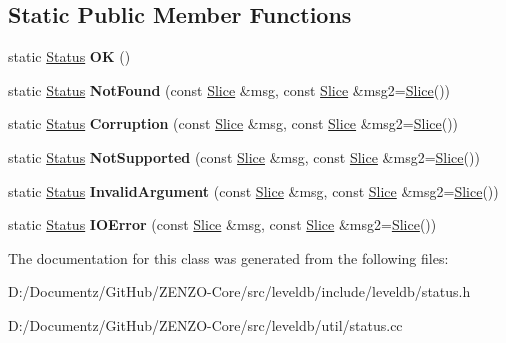 \subsection*{Static Public Member Functions}
\begin{DoxyCompactItemize}
\item 
\mbox{\label{classleveldb_1_1_status_a8e3720d233281c874a53c17e081f51b3}} 
static \mbox{\hyperlink{classleveldb_1_1_status}{Status}} {\bfseries OK} ()
\item 
\mbox{\label{classleveldb_1_1_status_a9e5beb5b2e758f041e0c012426e7b1b8}} 
static \mbox{\hyperlink{classleveldb_1_1_status}{Status}} {\bfseries Not\+Found} (const \mbox{\hyperlink{classleveldb_1_1_slice}{Slice}} \&msg, const \mbox{\hyperlink{classleveldb_1_1_slice}{Slice}} \&msg2=\mbox{\hyperlink{classleveldb_1_1_slice}{Slice}}())
\item 
\mbox{\label{classleveldb_1_1_status_a755b1ee5b0029cf9ea1128f1cdff5855}} 
static \mbox{\hyperlink{classleveldb_1_1_status}{Status}} {\bfseries Corruption} (const \mbox{\hyperlink{classleveldb_1_1_slice}{Slice}} \&msg, const \mbox{\hyperlink{classleveldb_1_1_slice}{Slice}} \&msg2=\mbox{\hyperlink{classleveldb_1_1_slice}{Slice}}())
\item 
\mbox{\label{classleveldb_1_1_status_a66c6b7171cedb55651e34e5df9a14705}} 
static \mbox{\hyperlink{classleveldb_1_1_status}{Status}} {\bfseries Not\+Supported} (const \mbox{\hyperlink{classleveldb_1_1_slice}{Slice}} \&msg, const \mbox{\hyperlink{classleveldb_1_1_slice}{Slice}} \&msg2=\mbox{\hyperlink{classleveldb_1_1_slice}{Slice}}())
\item 
\mbox{\label{classleveldb_1_1_status_aefef9f88d0a6ca6d34bd9dec1670309e}} 
static \mbox{\hyperlink{classleveldb_1_1_status}{Status}} {\bfseries Invalid\+Argument} (const \mbox{\hyperlink{classleveldb_1_1_slice}{Slice}} \&msg, const \mbox{\hyperlink{classleveldb_1_1_slice}{Slice}} \&msg2=\mbox{\hyperlink{classleveldb_1_1_slice}{Slice}}())
\item 
\mbox{\label{classleveldb_1_1_status_ada6143081d41803808f77287153f96b7}} 
static \mbox{\hyperlink{classleveldb_1_1_status}{Status}} {\bfseries I\+O\+Error} (const \mbox{\hyperlink{classleveldb_1_1_slice}{Slice}} \&msg, const \mbox{\hyperlink{classleveldb_1_1_slice}{Slice}} \&msg2=\mbox{\hyperlink{classleveldb_1_1_slice}{Slice}}())
\end{DoxyCompactItemize}


The documentation for this class was generated from the following files\+:\begin{DoxyCompactItemize}
\item 
D\+:/\+Documentz/\+Git\+Hub/\+Z\+E\+N\+Z\+O-\/\+Core/src/leveldb/include/leveldb/status.\+h\item 
D\+:/\+Documentz/\+Git\+Hub/\+Z\+E\+N\+Z\+O-\/\+Core/src/leveldb/util/status.\+cc\end{DoxyCompactItemize}

